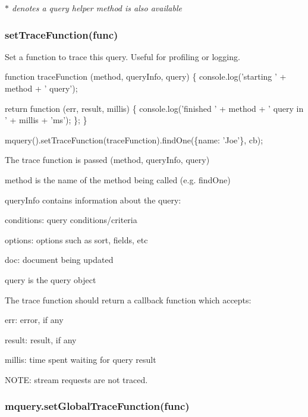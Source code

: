 {\itshape $\ast$ denotes a query helper method is also available}

\subsubsection*{set\+Trace\+Function(func)}

Set a function to trace this query. Useful for profiling or logging.


\begin{DoxyCode}
function traceFunction (method, queryInfo, query) \{
  console.log('starting ' + method + ' query');

  return function (err, result, millis) \{
    console.log('finished ' + method + ' query in ' + millis + 'ms');
  \};
\}

mquery().setTraceFunction(traceFunction).findOne(\{name: 'Joe'\}, cb);
\end{DoxyCode}


The trace function is passed (method, query\+Info, query)


\begin{DoxyItemize}
\item method is the name of the method being called (e.\+g. find\+One)
\item query\+Info contains information about the query\+:
\begin{DoxyItemize}
\item conditions\+: query conditions/criteria
\item options\+: options such as sort, fields, etc
\item doc\+: document being updated
\end{DoxyItemize}
\item query is the query object
\end{DoxyItemize}

The trace function should return a callback function which accepts\+:
\begin{DoxyItemize}
\item err\+: error, if any
\item result\+: result, if any
\item millis\+: time spent waiting for query result
\end{DoxyItemize}

N\+O\+TE\+: stream requests are not traced.

\subsubsection*{mquery.\+set\+Global\+Trace\+Function(func)}

